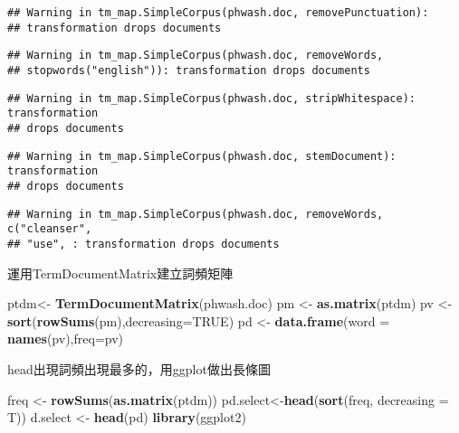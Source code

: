 \documentclass[]{article}
\newenvironment{Shaded}{\begin{snugshade}}{\end{snugshade}}
\newcommand{\KeywordTok}[1]{\textcolor[rgb]{0.13,0.29,0.53}{\textbf{{#1}}}}
\newcommand{\DataTypeTok}[1]{\textcolor[rgb]{0.13,0.29,0.53}{{#1}}}
\newcommand{\StringTok}[1]{\textcolor[rgb]{0.31,0.60,0.02}{{#1}}}
\newcommand{\OtherTok}[1]{\textcolor[rgb]{0.56,0.35,0.01}{{#1}}}
\newcommand{\NormalTok}[1]{{#1}}
\begin{document}
\begin{verbatim}
## Warning in tm_map.SimpleCorpus(phwash.doc, removePunctuation):
## transformation drops documents
\end{verbatim}

\begin{verbatim}
## Warning in tm_map.SimpleCorpus(phwash.doc, removeWords,
## stopwords("english")): transformation drops documents
\end{verbatim}

\begin{verbatim}
## Warning in tm_map.SimpleCorpus(phwash.doc, stripWhitespace): transformation
## drops documents
\end{verbatim}

\begin{verbatim}
## Warning in tm_map.SimpleCorpus(phwash.doc, stemDocument): transformation
## drops documents
\end{verbatim}

\begin{verbatim}
## Warning in tm_map.SimpleCorpus(phwash.doc, removeWords, c("cleanser",
## "use", : transformation drops documents
\end{verbatim}

運用TermDocumentMatrix建立詞頻矩陣

\begin{Shaded}
\begin{Highlighting}[]
\NormalTok{ptdm<-}\StringTok{ }\KeywordTok{TermDocumentMatrix}\NormalTok{(phwash.doc)}
\NormalTok{pm <-}\StringTok{ }\KeywordTok{as.matrix}\NormalTok{(ptdm)}
\NormalTok{pv <-}\StringTok{ }\KeywordTok{sort}\NormalTok{(}\KeywordTok{rowSums}\NormalTok{(pm),}\DataTypeTok{decreasing=}\OtherTok{TRUE}\NormalTok{)}
\NormalTok{pd <-}\StringTok{ }\KeywordTok{data.frame}\NormalTok{(}\DataTypeTok{word =} \KeywordTok{names}\NormalTok{(pv),}\DataTypeTok{freq=}\NormalTok{pv)}
\end{Highlighting}
\end{Shaded}

head出現詞頻出現最多的，用ggplot做出長條圖

\begin{Shaded}
\begin{Highlighting}[]
\NormalTok{freq <-}\StringTok{ }\KeywordTok{rowSums}\NormalTok{(}\KeywordTok{as.matrix}\NormalTok{(ptdm))}
\NormalTok{pd.select<-}\KeywordTok{head}\NormalTok{(}\KeywordTok{sort}\NormalTok{(freq, }\DataTypeTok{decreasing =} \NormalTok{T))}
\NormalTok{d.select <-}\StringTok{ }\KeywordTok{head}\NormalTok{(pd)}
\KeywordTok{library}\NormalTok{(ggplot2)}
\end{Highlighting}
\end{Shaded}
\end{document}
